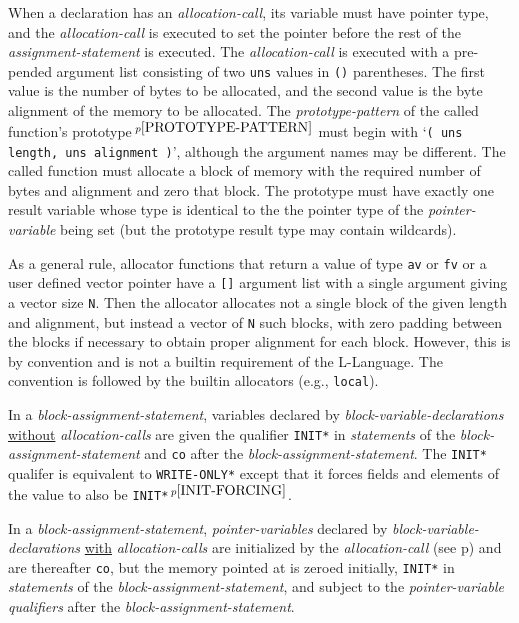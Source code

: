 \documentclass[12pt]{article}
\newcommand{\pagref}[1]{p\pageref{#1}}
\newcommand{\pagnote}[1]{$\,^{p\pageref{#1}}$}
\newcommand{\EOL}{\penalty \exhyphenpenalty}
\begin{document}
When a declaration has an {\em allocation-call}\label{ALLOCATION-CALLS},
its variable must have pointer
type, and the {\em allocation-call} is executed to set the pointer
before the rest of the {\em assignment-statement} is
executed.  The {\em allocation-call} is executed
with a pre-pended argument list consisting of two {\tt uns} values
in {\tt ()} parentheses.  The first value is the number of bytes to
be allocated, and the second value is the byte alignment of the
memory to be allocated.
The {\em prototype-pattern}
of the called function's prototype\pagnote{PROTOTYPE-PATTERN}
must begin with `{\tt ( uns length, uns alignment )}', although
the argument names may be different.
The called function must allocate a block of
memory with the required number of bytes and alignment and zero that
block.  The prototype must have
exactly one result variable whose type is identical to the
the pointer type of the {\em pointer-variable} being set (but the
prototype result type may contain wildcards).

As a general rule, allocator functions that return a value of
type {\tt av} or {\tt fv} or a user defined vector pointer
have a {\tt []} argument list
with a single argument giving a vector size {\tt N}.
Then the allocator allocates not a single block of the given length
and alignment, but instead a vector of {\tt N} such blocks, with zero padding
between the blocks if necessary to obtain proper alignment for each
block.  However,
this is by convention and is not a builtin requirement of the L-Language.
The convention is followed by the builtin allocators (e.g., {\tt local}).

In a {\em block-assignment-statement},
variables declared by {\em block-variable-declarations}
\underline{without} {\em allocation-calls}
are given the qualifier {\tt *INIT*} in {\em statements}
of the {\em block-assignment-statement} and {\tt co} after the
{\em block-assignment-statement}.
The {\tt *INIT*} qualifer is equivalent to {\tt *WRITE-\EOL ONLY*}
except that it forces fields and elements of the value to also
be {\tt *INIT*}\pagnote{INIT-FORCING}.

In a {\em block-assignment-statement},
{\em pointer-variables} declared by {\em block-variable-declarations}
\underline{with} {\em allocation-calls}
are initialized by the {\em allocation-call}
(see \pagref{ALLOCATION-CALLS}) and are thereafter
{\tt co}, but the memory
pointed at is zeroed initially,
{\tt *INIT*} in {\em statements}
of the {\em block-assignment-statement}, and
subject to the {\em pointer-variable} {\em qualifiers} after
the {\em block-assignment-statement}.
\end{document}
